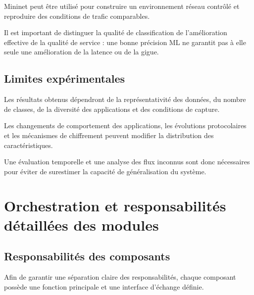 Mininet peut être utilisé pour construire un
environnement réseau contrôlé et reproduire
des conditions de trafic comparables.

Il est important de distinguer la qualité de
classification de l'amélioration effective de
la qualité de service : une bonne précision ML
ne garantit pas à elle seule une amélioration
de la latence ou de la gigue.

\subsection{Limites expérimentales}

Les résultats obtenus dépendront de la représentativité
des données, du nombre de classes, de la diversité
des applications et des conditions de capture.

Les changements de comportement des applications,
les évolutions protocolaires et les mécanismes
de chiffrement peuvent modifier la distribution
des caractéristiques.

Une évaluation temporelle et une analyse des flux
inconnus sont donc nécessaires pour éviter de
surestimer la capacité de généralisation du système.






\section{Orchestration et responsabilités détaillées des modules}

\subsection{Responsabilités des composants}

Afin de garantir une séparation claire des responsabilités,
chaque composant possède une fonction principale et une
interface d'échange définie.

